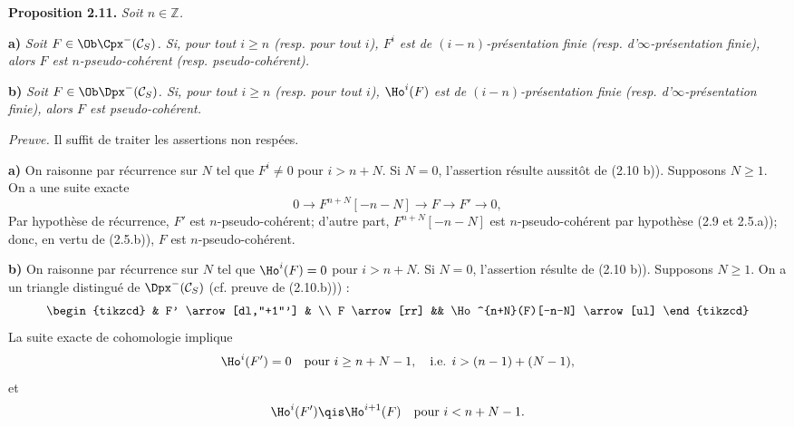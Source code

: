 \textbf{Proposition 2.11.} \emph{Soit \(n\in\mathbb Z\).}

\textbf{a)} \emph{Soit \(F\in\Ob\Cpx^-(\mathcal C_S)\). Si, pour tout \(i\geq n\) (resp. pour tout \(i\)), \(F^i\) est de \((i-n)\)-présentation finie (resp. d'\(\infty\)-présentation finie), alors \(F\) est \(n\)-pseudo-cohérent (resp. pseudo-cohérent).}

\textbf{b)} \emph{Soit \(F\in\Ob\Dpx^-(\mathcal C_S)\). Si, pour tout \(i\geq n\) (resp. pour tout \(i\)), \(\Ho^i(F)\) est de \((i-n)\)-présentation finie (resp. d'\(\infty\)-présentation finie), alors \(F\) est pseudo-cohérent.}

\emph{Preuve.} Il suffit de traiter les assertions non respées.

\textbf{a)} On raisonne par récurrence sur \(N\) tel que \(F^i\neq0\) pour \(i>n+N\). Si \(N=0\), l'assertion résulte aussitôt de (2.10 b)). Supposons \(N\geq1\). On a une suite exacte
\[
  0\longrightarrow F^{n+N}[-n-N]\longrightarrow F\longrightarrow F'\longrightarrow 0,
\]
Par hypothèse de récurrence, \(F'\) est \(n\)-pseudo-cohérent; d'autre part, \(F^{n+N}[-n-N]\) est \(n\)-pseudo-cohérent par hypothèse (2.9 et 2.5.a)); donc, en vertu de (2.5.b)), \(F\) est \(n\)-pseudo-cohérent.

\textbf{b)} On raisonne par récurrence sur \(N\) tel que \(\Ho^i(F)=0\) pour \(i>n+N\). Si \(N=0\), l'assertion résulte de (2.10 b)). Supposons \(N\geq1\). On a un triangle distingué de \(\Dpx^-(\mathcal C_S)\) (cf. preuve de (2.10.b))) :
\[
\begin{tikzcd}
& F' \arrow[dl,"+1"'] & \\
F \arrow[rr] && \Ho^{n+N}(F)[-n-N] \arrow[ul]
\end{tikzcd}
\]
La suite exacte de cohomologie implique
\[
  \Ho^i(F')=0\quad\text{pour }i\geq n+N-1,\quad\text{i.e. }i>(n-1)+(N-1),
\]
et
\[
  \Ho^i(F')\qis\Ho^{i+1}(F)\quad\text{pour }i<n+N-1 .
\]
